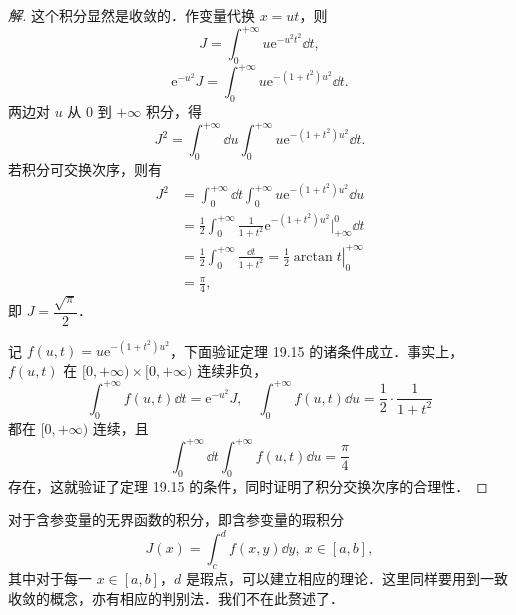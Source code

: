 \begin{proof}[解]
这个积分显然是收敛的．作变量代换 $x=ut$，则
\[
J=\int_{0}^{+\infty}u\mathrm{e}^{-u^{2}t^{2}}\dd t,
\]
\[
\mathrm{e}^{-u^{2}}J=\int_{0}^{+\infty}u\mathrm{e}^{-(1+t^{2})u^{2}}\dd t.
\]
两边对 $u$ 从 $0$ 到 $+\infty$ 积分，得
\[
J^{2}=\int_{0}^{+\infty}\dd u\int_{0}^{+\infty}u\mathrm{e}^{-(1+t^{2})u^{2}}\dd t.
\]
若积分可交换次序，则有
\[
\begin{aligned}
J^{2}&=\int_{0}^{+\infty}\dd t\int_{0}^{+\infty}u\mathrm{e}^{-(1+t^{2})u^{2}}\dd u\\
&=\frac{1}{2}\int_{0}^{+\infty}\frac{1}{1+t^{2}}\mathrm{e}^{-(1+t^{2})u^{2}}\bigg|_{+\infty}^{0}\dd t\\
&=\frac{1}{2}\int_{0}^{+\infty}\frac{\dd t}{1+t^{2}}=\left.\frac{1}{2}\arctan t\right|_{0}^{+\infty}\\
&=\frac{\pi}{4},
\end{aligned}
\]
即 $J=\dfrac{\sqrt{\pi}}{2}$．

记 $f(u,t)=u\mathrm{e}^{-(1+t^{2})u^{2}}$，下面验证定理 19.15 的诸条件成立．事实上，$f(u,t)$ 在 $[0,+\infty)\times[0,+\infty)$ 连续非负，
\[
\int_{0}^{+\infty}f(u,t)\dd t=\mathrm{e}^{-u^{2}}J,\quad\int_{0}^{+\infty}f(u,t)\dd u=\frac{1}{2}\cdot\frac{1}{1+t^{2}}
\]
都在 $[0,+\infty)$ 连续，且
\[
\int_{0}^{+\infty}\dd t\int_{0}^{+\infty}f(u,t)\dd u=\frac{\pi}{4}
\]
存在，这就验证了定理 19.15 的条件，同时证明了积分交换次序的合理性．
\end{proof}

对于含参变量的无界函数的积分，即含参变量的瑕积分
\[
J(x)=\int_{c}^{d}f(x,y)\dd y,\ x\in[a,b],
\]
其中对于每一 $x\in[a,b]$，$d$ 是瑕点，可以建立相应的理论．这里同样要用到一致收敛的概念，亦有相应的判别法．我们不在此赘述了．

